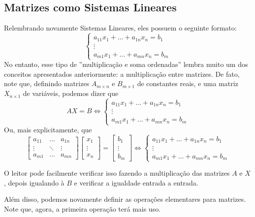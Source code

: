 \documentclass[../main.tex]{subfiles}
\begin{document}
		\subsection{Matrizes como Sistemas Lineares}
			Relembrando novamente Sistemas Lineares, eles possuem o seguinte formato:
			\[
			\begin{cases}
				a_{11}x_1+\dots +a_{1n}x_n=b_1\\
				\vdots\\
				a_{m1}x_1+\dots +a_{mn}x_n=b_m
			\end{cases}
			\]
			No entanto, esse tipo de ''multiplicação e soma ordenadas'' lembra muito um dos conceitos apresentados anteriormente: a multiplicação entre matrizes. De fato, note que, definindo matrizes $A_{m\times n}$ e $B_{m\times 1}$ de constantes reais, e uma matriz $X_{n\times 1}$ de variáveis, podemos dizer que
			\[
			AX=B\Leftrightarrow \begin{cases}
				a_{11}x_1+\dots +a_{1n}x_n=b_1\\
				\vdots\\
				a_{m1}x_1+\dots +a_{mn}x_n=b_m
			\end{cases}
			\]
			Ou, mais explicitamente, que
			\[
			\begin{bmatrix}
				a_{11} & \dots & a_{1n}\\
				\vdots & \ddots& \vdots\\
				a_{m1} & \dots & a_{mn}
			\end{bmatrix}
			\begin{bmatrix}
				x_1\\
				\vdots\\
				x_n
			\end{bmatrix}=
			\begin{bmatrix}
				b_1\\
				\vdots\\
				b_m
			\end{bmatrix}
			\Leftrightarrow
			\begin{cases}
				a_{11}x_1+\dots +a_{1n}x_n=b_1\\
				\vdots\\
				a_{m1}x_1+\dots +a_{mn}x_n=b_m
			\end{cases}
			\]
			
			O leitor pode facilmente verificar isso fazendo a multiplicação das matrizes $A$ e $X$, depois igualando à $B$ e verificar a igualdade entrada a entrada.
			
			Além disso, podemos novamente definir as operações elementares para matrizes. Note que, agora, a primeira operação terá mais uso.
			
\end{document}
